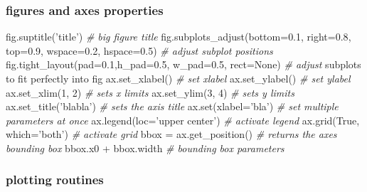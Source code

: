 \documentclass[10pt,a4paperpaper,twocolumn]{article}
\newenvironment{Shaded}{}{}
\newcommand{\DecValTok}[1]{\textcolor[rgb]{0.25,0.63,0.44}{{#1}}}
\newcommand{\FloatTok}[1]{\textcolor[rgb]{0.25,0.63,0.44}{{#1}}}
\newcommand{\StringTok}[1]{\textcolor[rgb]{0.25,0.44,0.63}{{#1}}}
\newcommand{\CommentTok}[1]{\textcolor[rgb]{0.38,0.63,0.69}{\textit{{#1}}}}
\newcommand{\VariableTok}[1]{\textcolor[rgb]{0.10,0.09,0.49}{{#1}}}
\newcommand{\OperatorTok}[1]{\textcolor[rgb]{0.40,0.40,0.40}{{#1}}}
\newcommand{\BuiltInTok}[1]{{#1}}
\newcommand{\NormalTok}[1]{{#1}}
\begin{document}
\hypertarget{figures-and-axes-properties}{\subsubsection{figures and
axes properties}\label{figures-and-axes-properties}}

\begin{Shaded}
\begin{Highlighting}[]
\NormalTok{fig.suptitle(}\StringTok{'title'}\NormalTok{)            }\CommentTok{# big figure title}
\NormalTok{fig.subplots_adjust(bottom}\OperatorTok{=}\FloatTok{0.1}\NormalTok{, right}\OperatorTok{=}\FloatTok{0.8}\NormalTok{, top}\OperatorTok{=}\FloatTok{0.9}\NormalTok{, wspace}\OperatorTok{=}\FloatTok{0.2}\NormalTok{,}
                    \NormalTok{hspace}\OperatorTok{=}\FloatTok{0.5}\NormalTok{)  }\CommentTok{# adjust subplot positions}
\NormalTok{fig.tight_layout(pad}\OperatorTok{=}\FloatTok{0.1}\NormalTok{,h_pad}\OperatorTok{=}\FloatTok{0.5}\NormalTok{, w_pad}\OperatorTok{=}\FloatTok{0.5}\NormalTok{, rect}\OperatorTok{=}\VariableTok{None}\NormalTok{) }\CommentTok{# adjust}
\NormalTok{subplots to fit perfectly into fig}
\NormalTok{ax.set_xlabel()                  }\CommentTok{# set xlabel}
\NormalTok{ax.set_ylabel()                  }\CommentTok{# set ylabel}
\NormalTok{ax.set_xlim(}\DecValTok{1}\NormalTok{, }\DecValTok{2}\NormalTok{)                }\CommentTok{# sets x limits}
\NormalTok{ax.set_ylim(}\DecValTok{3}\NormalTok{, }\DecValTok{4}\NormalTok{)                }\CommentTok{# sets y limits}
\NormalTok{ax.set_title(}\StringTok{'blabla'}\NormalTok{)           }\CommentTok{# sets the axis title}
\NormalTok{ax.}\BuiltInTok{set}\NormalTok{(xlabel}\OperatorTok{=}\StringTok{'bla'}\NormalTok{)             }\CommentTok{# set multiple parameters at once}
\NormalTok{ax.legend(loc}\OperatorTok{=}\StringTok{'upper center'}\NormalTok{)    }\CommentTok{# activate legend}
\NormalTok{ax.grid(}\VariableTok{True}\NormalTok{, which}\OperatorTok{=}\StringTok{'both'}\NormalTok{)      }\CommentTok{# activate grid}
\NormalTok{bbox }\OperatorTok{=} \NormalTok{ax.get_position()         }\CommentTok{# returns the axes bounding box}
\NormalTok{bbox.x0 }\OperatorTok{+} \NormalTok{bbox.width             }\CommentTok{# bounding box parameters}
\end{Highlighting}
\end{Shaded}

\hypertarget{plotting-routines}{\subsubsection{plotting
routines}\label{plotting-routines}}
\end{document}
